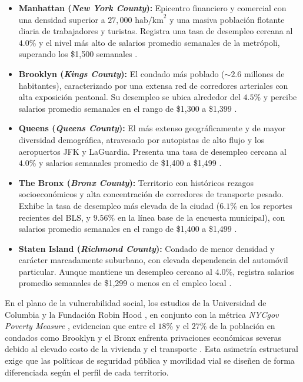 \begin{itemize}
    \item \textbf{Manhattan (\textit{New York County}):} Epicentro financiero y comercial con una densidad superior a $27,000\text{ hab/km}^2$ y una masiva población flotante diaria de trabajadores y turistas. Registra una tasa de desempleo cercana al $4.0\%$ y el nivel más alto de salarios promedio semanales de la metrópoli, superando los \$1,500 semanales \cite{bls_nyc_2024}.

    \item \textbf{Brooklyn (\textit{Kings County}):} El condado más poblado ($\sim 2.6$ millones de habitantes), caracterizado por una extensa red de corredores arteriales con alta exposición peatonal. Su desempleo se ubica alrededor del $4.5\%$ y percibe salarios promedio semanales en el rango de \$1,300 a \$1,399 \cite{bls_nyc_2024}.

    \item \textbf{Queens (\textit{Queens County}):} El más extenso geográficamente y de mayor diversidad demográfica, atravesado por autopistas de alto flujo y los aeropuertos JFK y LaGuardia. Presenta una tasa de desempleo cercana al $4.0\%$ y salarios semanales promedio de \$1,400 a \$1,499 \cite{bls_nyc_2024}.

    \item \textbf{The Bronx (\textit{Bronx County}):} Territorio con históricos rezagos socioeconómicos y alta concentración de corredores de transporte pesado. Exhibe la tasa de desempleo más elevada de la ciudad ($6.1\%$ en los reportes recientes del BLS, y $9.56\%$ en la línea base de la encuesta municipal), con salarios promedio semanales en el rango de \$1,400 a \$1,499 \cite{bls_nyc_2024}.

    \item \textbf{Staten Island (\textit{Richmond County}):} Condado de menor densidad y carácter marcadamente suburbano, con elevada dependencia del automóvil particular. Aunque mantiene un desempleo cercano al $4.0\%$, registra salarios promedio semanales de \$1,299 o menos en el empleo local \cite{bls_nyc_2024}.
\end{itemize}

En el plano de la vulnerabilidad social, los estudios de la Universidad de Columbia y la Fundación Robin Hood \cite{columbia_robinhood_2024}, en conjunto con la métrica \textit{NYCgov Poverty Measure} \cite{nyc_opportunity_2024}, evidencian que entre el $18\%$ y el $27\%$ de la población en condados como Brooklyn y el Bronx enfrenta privaciones económicas severas debido al elevado costo de la vivienda y el transporte \cite{osc_nyc_economy_2024}. Esta asimetría estructural exige que las políticas de seguridad pública y movilidad vial se diseñen de forma diferenciada según el perfil de cada territorio.

